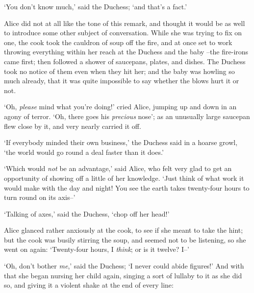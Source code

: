   `You don't know much,' said the Duchess; `and that's a fact.'

  Alice did not at all like the tone of this remark, and thought
it would be as well to introduce some other subject of
conversation.  While she was trying to fix on one, the cook took
the cauldron of soup off the fire, and at once set to work
throwing everything within her reach at the Duchess and the baby
--the fire-irons came first; then followed a shower of saucepans,
plates, and dishes.  The Duchess took no notice of them even when
they hit her; and the baby was howling so much already, that it
was quite impossible to say whether the blows hurt it or not.

  `Oh, {\it please} mind what you're doing!' cried Alice, jumping up
and down in an agony of terror.  `Oh, there goes his {\it precious}
nose'; as an unusually large saucepan flew close by it, and very
nearly carried it off.

  `If everybody minded their own business,' the Duchess said in a
hoarse growl, `the world would go round a deal faster than it
does.'

  `Which would {\it not} be an advantage,' said Alice, who felt very
glad to get an opportunity of showing off a little of her
knowledge.  `Just think of what work it would make with the day
and night!  You see the earth takes twenty-four hours to turn
round on its axis--'

  `Talking of axes,' said the Duchess, `chop off her head!'

  Alice glanced rather anxiously at the cook, to see if she meant
to take the hint; but the cook was busily stirring the soup, and
seemed not to be listening, so she went on again:  `Twenty-four
hours, I {\it think}; or is it twelve?  I--'

  `Oh, don't bother {\it me},' said the Duchess; `I never could abide
figures!'  And with that she began nursing her child again,
singing a sort of lullaby to it as she did so, and giving it a
violent shake at the end of every line:
\onelineskip
{}
\onelineskip

\onelineskip

\onelineskip

\onelineskip

